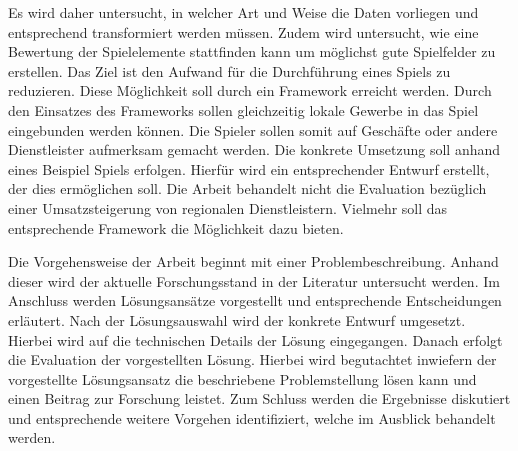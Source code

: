 Es wird daher untersucht, in welcher Art und Weise die Daten vorliegen und entsprechend transformiert werden müssen.
Zudem wird untersucht, wie eine Bewertung der Spielelemente stattfinden kann um möglichst gute Spielfelder zu erstellen.
Das Ziel ist den Aufwand für die Durchführung eines Spiels zu reduzieren. Diese Möglichkeit soll durch ein Framework erreicht werden. Durch den Einsatzes des Frameworks sollen gleichzeitig lokale Gewerbe in das Spiel eingebunden werden können. Die Spieler sollen somit auf Geschäfte oder andere Dienstleister aufmerksam gemacht werden.
Die konkrete Umsetzung soll anhand eines Beispiel Spiels erfolgen.
Hierfür wird ein entsprechender Entwurf erstellt, der dies ermöglichen soll.
Die Arbeit behandelt nicht die Evaluation bezüglich einer Umsatzsteigerung von regionalen Dienstleistern. Vielmehr soll das entsprechende Framework die Möglichkeit dazu bieten.

Die Vorgehensweise der Arbeit beginnt mit einer Problembeschreibung. Anhand dieser wird der aktuelle Forschungsstand in der Literatur untersucht werden. Im Anschluss werden Lösungsansätze vorgestellt und entsprechende Entscheidungen erläutert. Nach der Lösungsauswahl wird der konkrete Entwurf umgesetzt. Hierbei wird auf die technischen Details der Lösung eingegangen. Danach erfolgt die Evaluation der vorgestellten Lösung. Hierbei wird begutachtet inwiefern der vorgestellte Lösungsansatz die beschriebene Problemstellung lösen kann und einen Beitrag zur Forschung leistet. Zum Schluss werden die Ergebnisse diskutiert und entsprechende weitere Vorgehen identifiziert, welche im Ausblick behandelt werden.

